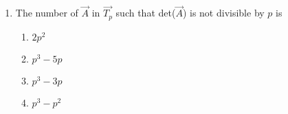 \documentclass[journal,12pt,twocolumn]{IEEEtran}
\theoremstyle{remark}
\begin{document}
\begin{multicols}{2}
\begin{enumerate}
		\item The number of $\vec{A}$ in $\vec{T_p}$ such that det($\vec{A}$) is not divisible by $p$ is 
			\begin{enumerate}
				\item $2p^2$
				\item $p^3-5p$
				\item $p^3-3p$
				\item $p^3-p^2$
			\end{enumerate}

	\end{enumerate}

\end{multicols}
\end{document}
